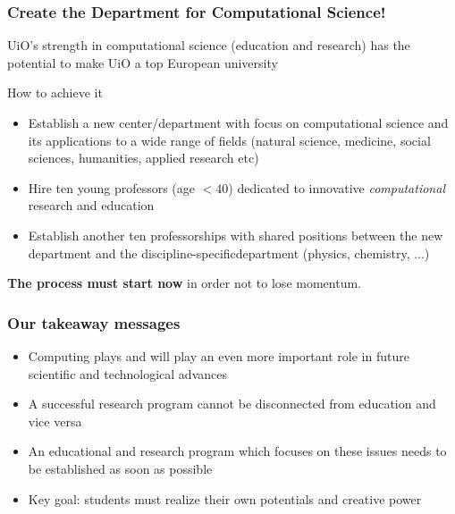 \documentclass{beamer}
\begin{document}
\begin{frame}
\frametitle{Create the Department for Computational Science!}

\begin{block}{}
UiO's strength in computational science (education and research)
has the potential to make UiO a top European university
\end{block}

\begin{block}{How to achieve it }
\begin{itemize}
\item Establish  a new center/department with focus on computational science and its applications to a wide range of fields (natural science, medicine, social sciences, humanities, applied research etc)

\item Hire ten young professors (age $< 40$) dedicated to innovative \emph{computational} research and education

\item Establish another ten professorships with  shared positions between the  new department and the discipline-specificdepartment (physics, chemistry, ...)
\end{itemize}

\noindent
\end{block}

\textbf{The process must start now} in order not to lose momentum.
\end{frame}

\begin{frame}
\frametitle{Our takeaway messages}

\begin{block}{}
\begin{itemize}
\item Computing plays and will play an even more important role in future scientific and technological advances

\item A successful research program cannot be disconnected from education and vice versa

\item An educational and research program which focuses on these issues needs to be established as soon as possible

\item Key goal: students must realize their own potentials and creative power
\end{itemize}

\noindent
\end{block}
\end{frame}
\end{document}
